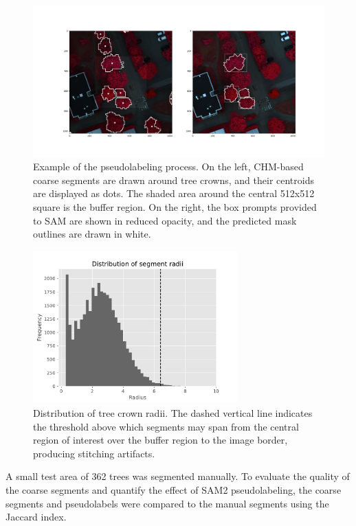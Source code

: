 \documentclass[english, 12pt, a4paper, sci, utf8, a-2b, online]{aaltothesis}
\begin{document}
\begin{figure}[h]
    \centering
    \includegraphics[width=1.0\textwidth]{figures/pseudolabel-example.png}
    \caption{Example of the pseudolabeling process. On the left, CHM-based coarse segments are drawn around tree crowns, and their centroids are displayed as dots. The shaded area around the central 512x512 square is the buffer region. On the right, the box prompts provided to SAM are shown in reduced opacity, and the predicted mask outlines are drawn in white.}
    \label{fig:pseudolabel}
\end{figure}

\begin{figure}[h]
    \centering
    \includegraphics[width=0.7\textwidth]{figures/radii.pdf}
    \caption{Distribution of tree crown radii. The dashed vertical line indicates the threshold above which segments may span from the central region of interest over the buffer region to the image border, producing stitching artifacts.}
    \label{fig:radii}
\end{figure}

A small test area of 362 trees was segmented manually. To evaluate the quality of the coarse segments and quantify the effect of SAM2 pseudolabeling, the coarse segments and pseudolabels were compared to the manual segments using the Jaccard index.
\end{document}
